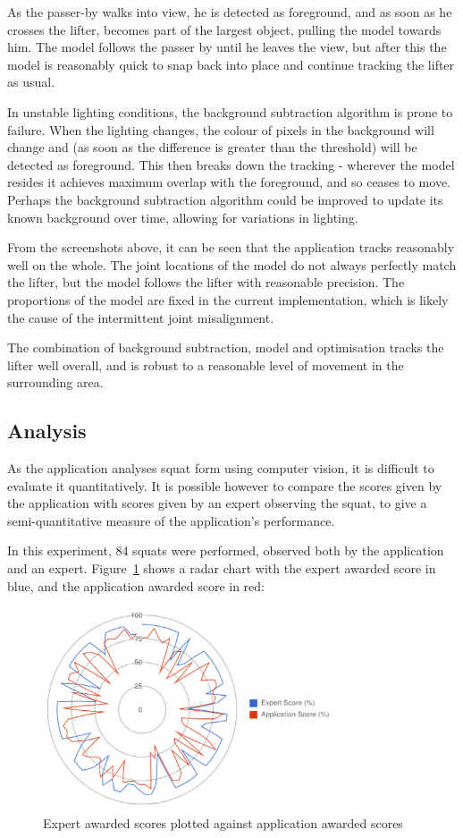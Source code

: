 As the passer-by walks into view, he is detected as foreground, and as soon as he crosses the lifter, becomes part of the largest object, pulling the model towards him. The model follows the passer by until he leaves the view, but after this the model is reasonably quick to snap back into place and continue tracking the lifter as usual.

In unstable lighting conditions, the background subtraction algorithm is prone to failure. When the lighting changes, the colour of pixels in the background will change and (as soon as the difference is greater than the threshold) will be detected as foreground. This then breaks down the tracking - wherever the model resides it achieves maximum overlap with the foreground, and so ceases to move. Perhaps the background subtraction algorithm could be improved to update its known background over time, allowing for variations in lighting.

From the screenshots above, it can be seen that the application tracks reasonably well on the whole. The joint locations of the model do not always perfectly match the lifter, but the model follows the lifter with reasonable precision. The proportions of the model are fixed in the current implementation, which is likely the cause of the intermittent joint misalignment.

The combination of background subtraction, model and optimisation tracks the lifter well overall, and is robust to a reasonable level of movement in the surrounding area.

\subsection{Analysis}
\label{sec:analysis_eval}

As the application analyses squat form using computer vision, it is difficult to evaluate it quantitatively. It is possible however to compare the scores given by the application with scores given by an expert observing the squat, to give a semi-quantitative measure of the application's performance.

In this experiment, 84 squats were performed, observed both by the application and an expert. Figure~\ref{fig:scorediff} shows a radar chart with the expert awarded score in blue, and the application awarded score in red:

\begin{figure}[H]
    \centering
	\includegraphics[height=6cm]{evaluation/images/scores_difference}
\caption{Expert awarded scores plotted against application awarded scores}
\label{fig:scorediff}
\end{figure}

